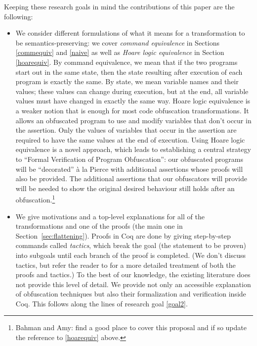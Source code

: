 \documentclass[compsoc,conference,a4paper,10pt,times]{IEEEtran}
\begin{document}
Keeping these research goals in mind the contributions of this paper are the following:
\begin{itemize}
    \item We consider different formulations of what it means for a transformation to be semantics-preserving: we cover \emph{command equivalence} in Sections \ref{commequiv} and \ref{naive} as well as \emph{Hoare logic equivalence} in Section \ref{hoarequiv}. By command equivalence, we mean that if the two programs start out in the same state, then the state resulting after execution of each program is exactly the same.  By state, we mean variable names and their values; these values can change during execution, but at the end, all variable values must have changed in exactly the same way.  
    Hoare logic equivalence is a weaker notion that is enough for most code obfuscation transformations. It allows an obfuscated program to use and modify variables that don't occur in the assertion.  Only the values of variables that occur in the assertion are required to have the same values at the end of execution.  Using Hoare logic equivalence is a novel approach, which leads to establishing a central strategy to ``Formal Verification of Program Obfuscation'': our obfuscated programs will be ``decorated''  \`a la  Pierce \cite{SFV2} with additional assertions whose proofs will also be provided\label{itm:1}. The additional assertions that our obfuscators will provide will be needed to show the original desired behaviour still holds after an obfuscation.\footnote{Bahman and Amy: find a good place to cover this proposal and if so update the reference to \ref{hoarequiv} above.}
    
    
    \item We give motivations and a top-level explanations for all of the transformations and one of the proofs (the main one in Section~\ref{sec:flattening}).  Proofs in Coq are done by giving step-by-step commands called \emph{tactics}, which break the goal (the statement to be proven) into subgoals until each branch of the proof is completed.  (We don't discuss tactics, but
    refer the reader to \cite{Weiyun} for a more detailed treatment of both the proofs and tactics.) 
    To the best of our knowledge, the existing literature does not provide this level of detail. We provide not only an accessible explanation of obfuscation techniques but also their formalization and verification inside Coq. This follows along the lines of research goal \ref{goal2}. 
 

\end{itemize}
\end{document}
